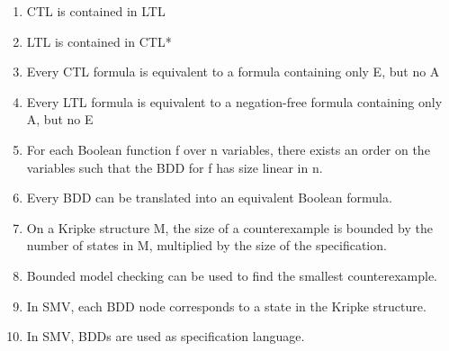 \documentclass[a4paper, 11pt]{article}
\begin{document}
\begin{enumerate}[label=(\alph*)]
    \item CTL is contained in LTL
    \item LTL is contained in CTL*
    \item Every CTL formula is equivalent to a formula containing only E, but no A
    \item Every LTL formula is equivalent to a negation-free formula containing only A, but no E
    \item For each Boolean function f over n variables, there exists an order on the variables such that the BDD for f has size linear in n.
    \item Every BDD can be translated into an equivalent Boolean formula.
    \item On a Kripke structure M, the size of a counterexample is bounded by the number of states in M, multiplied by the size of the specification.
    \item Bounded model checking can be used to find the smallest counterexample.
    \item In SMV, each BDD node corresponds to a state in the Kripke structure.
    \item In SMV, BDDs are used as specification language.
\end{enumerate}
\end{document}
